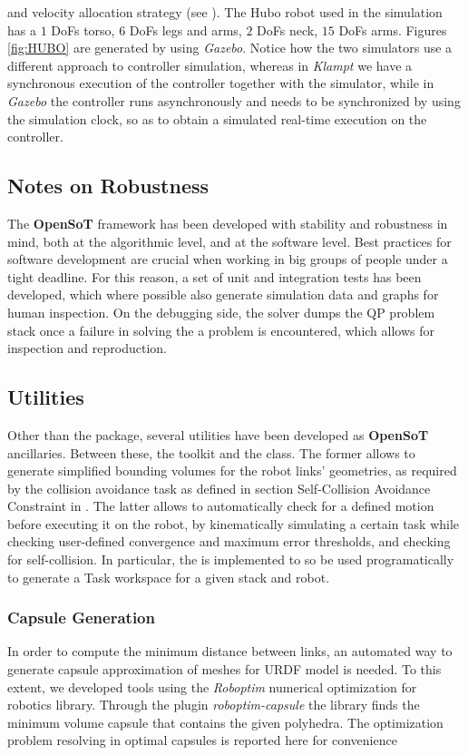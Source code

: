 and velocity allocation strategy (see ).
The Hubo robot used in the simulation has a $1$ DoFs torso, $6$ DoFs legs and arms, $2$ DoFs neck, $15$ DoFs arms. Figures \ref{fig:HUBO} are generated by using \emph{Gazebo}. Notice how the two simulators use a different approach to controller simulation, whereas in \emph{Klampt} we have a synchronous execution of the controller together with the simulator, while in \emph{Gazebo} the controller runs asynchronously and needs to be synchronized by using the simulation clock, so as to obtain a simulated real-time execution on the controller.

\subsection{Notes on Robustness}
The \textbf{OpenSoT} framework has been developed with stability and robustness in mind, both at the algorithmic level, and at the software level. Best practices for software development are crucial when working in big groups of people under a tight deadline. For this reason, a set of unit and integration tests has been developed, which where possible also generate simulation data and graphs for human inspection. On the debugging side, the solver dumps the QP problem stack once a failure in solving the a problem is encountered, which allows for inspection and reproduction.

\subsection{Utilities}
Other than the  package, several utilities have been developed as \textbf{OpenSoT} ancillaries. Between these, the  toolkit and the  class. The former allows to generate simplified bounding volumes for the robot links' geometries, as required by the collision avoidance task as defined in section Self-Collision Avoidance Constraint in \cite{rocchimingo:16}. %
The latter allows to automatically check for a defined motion before executing it on the robot, by kinematically simulating a certain task while checking user-defined convergence and maximum error thresholds, and checking for self-collision. In particular, the  is implemented to so be used programatically to generate a Task workspace for a given stack and robot.

\subsubsection{Capsule Generation}
\label{subsub:CapsuleGeneration}
In order to compute the minimum distance between links, an automated way to generate capsule approximation of meshes for URDF model is needed. To this extent, we developed tools using the \emph{Roboptim} \cite{Moulard2013-nk,Moulard_undated-tm} numerical optimization for robotics library. Through the plugin \emph{roboptim-capsule} the library finds the minimum volume capsule that contains the given polyhedra. The optimization problem resolving in optimal capsules is reported here for convenience \cite{El_Khoury2013-rp}

